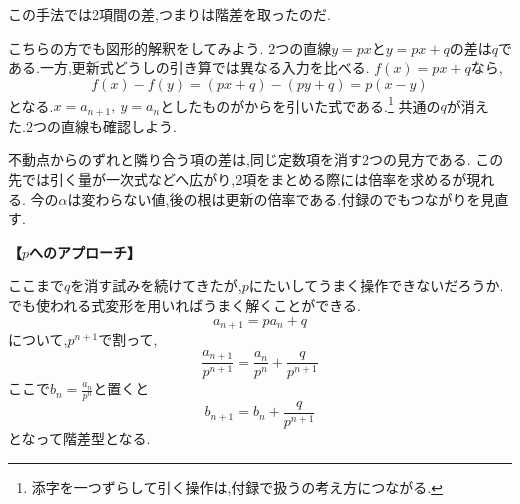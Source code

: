  この手法では2項間の差,つまりは階差を取ったのだ.
  
  こちらの方でも図形的解釈をしてみよう.
  2つの直線$y=px$と$y=px+q$の差は$q$である.一方,更新式どうしの引き算では異なる入力を比べる.
  $f(x)=px+q$なら,
  \[
    f(x)-f(y)=(px+q)-(py+q)=p(x-y)
  \]
  となる.$x=a_{n+1},\ y=a_n$としたものがからを引いた式である.\footnote{添字を一つずらして引く操作は,付録で扱うの考え方につながる.}
  共通の$q$が消えた.2つの直線も確認しよう.
  
  \begin{center}
  \end{center}
  
  不動点からのずれと隣り合う項の差は,同じ定数項を消す2つの見方である.
  この先では引く量が一次式などへ広がり,2項をまとめる際には倍率を求める\mbox{}が現れる.
  今の$\alpha$は変わらない値,後の根は更新の倍率である.付録のでもつながりを見直す.

  \noindent \textbf{【$p$へのアプローチ】}
  
  ここまで$q$を消す試みを続けてきたが,$p$にたいしてうまく操作できないだろうか.
  でも使われる式変形を用いればうまく解くことができる.
  \[
    a_{n+1}=pa_n+q
  \]
  について,$p^{n+1}$で割って,
  \[
    \frac{a_{n+1}}{p^{n+1}}=\frac{a_n}{p^n}+\frac{q}{p^{n+1}}
  \]
  ここで$\displaystyle b_n=\frac{a_n}{p^n}$と置くと
  \[
    b_{n+1}=b_n+\frac{q}{p^{n+1}}
  \]
  となって階差型となる.
